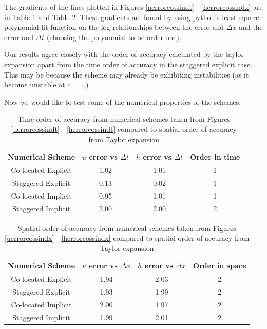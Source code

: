 \documentclass[a4paper,12pt, notitlepage]{article}
\begin{document}
The gradients of the lines plotted in Figures \ref{uerrorcossindt} - \ref{herrorcossindx}  are in Table \ref{gradientdt} and Table \ref{gradientdx}. These gradients are found by using python's least square polynomial fit function on the log relationships between the error and $\Delta x$ and the error and $\Delta t$ (choosing the polynomial to be order one). 

Our results agree closely with the order of accuracy calculated by the taylor expansion apart from the time order of accuracy in the staggered explicit case. This may be because the scheme may already be exhibiting instabilities (as it become unstable at $c = 1$.)

Now we would like to test some of the numerical properties of the schemes.

\begin{table}[H]
	\centering
	\begin{tabular}{|c | c| c| c|} 
		\hline
		\textbf{Numerical Scheme}  & $u$ error vs $\Delta t$ & $h$ error vs $\Delta t$ & Order in time \\
		\hline
		Co-located Explicit & 1.02 & 1.01 & 1\\ 
		\hline
		Staggered Explicit & 0.13 & 0.02 & 1\\
		\hline
		Co-located Implicit & 0.95 & 1.01 & 1\\
		\hline
		Staggered Implicit & 2.00 & 2.00 & 2\\
		\hline
	\end{tabular}
	\caption{Time order of accuracy from numerical schemes taken from Figures \ref{uerrorcossindt} - \ref{herrorcossindt} compared to spatial order of accuracy from Taylor expansion}
	\label{gradientdt}
\end{table}

\begin{table}[H]
	\centering
	\begin{tabular}{|c | c| c| c|} 
		\hline
		\textbf{Numerical Scheme} & $u$ error vs $\Delta x$ &  $h$ error vs $\Delta x$ & Order in space\\
		\hline
		Co-located Explicit & 1.94 & 2.03 & 2 \\ 
		\hline
		Staggered Explicit & 1.93 & 1.99 & 2 \\
		\hline
		Co-located Implicit & 2.00 & 1.97 & 2 \\
		\hline
		Staggered Implicit & 1.99 & 2.01 & 2 \\
		\hline
	\end{tabular}
	\caption{Spatial order of accuracy from numerical schemes taken from Figures \ref{uerrorcossindx} - \ref{herrorcossindx} compared to spatial order of accuracy from Taylor expansion}
	\label{gradientdx}
\end{table}
\end{document}
